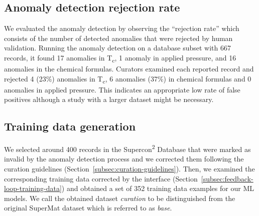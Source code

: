 \documentclass[]{interact}
\theoremstyle{plain} %
\theoremstyle{definition}
\theoremstyle{remark}
\begin{document}
\subsection{Anomaly detection rejection rate}
\label{subsec:anomaly-detection-evaluation}

We evaluated the anomaly detection by observing the ``rejection rate'' which consists of the number of detected anomalies that were rejected by human validation. 
Running the anomaly detection on a database subset with 667 records, it found 17 anomalies in T\textsubscript{c}, 1 anomaly in applied pressure, and 16 anomalies in the chemical formulas. 
Curators examined each reported record and rejected 4 (23\%) anomalies in T\textsubscript{c}, 6 anomalies (37\%) in chemical formulas and 0 anomalies in applied pressure. 
This indicates an appropriate low rate of false positives although a study with a larger dataset might be necessary. 

\subsection{Training data generation}
\label{subsec:training-data-generation-evaluation}
We selected around 400 records in the Supercon\textsuperscript{2} Database that were marked as invalid by the anomaly detection process and we corrected them following the curation guidelines (Section~\ref{subsec:curation-guidelines}).
Then, we examined the corresponding training data corrected by the interface (Section~\ref{subsec:feedback-loop-training-data}) and obtained a set of 352 training data examples for our ML models. 
We call the obtained dataset \emph{curation} to be distinguished from the original SuperMat dataset which is referred to as \emph{base}.
\end{document}
